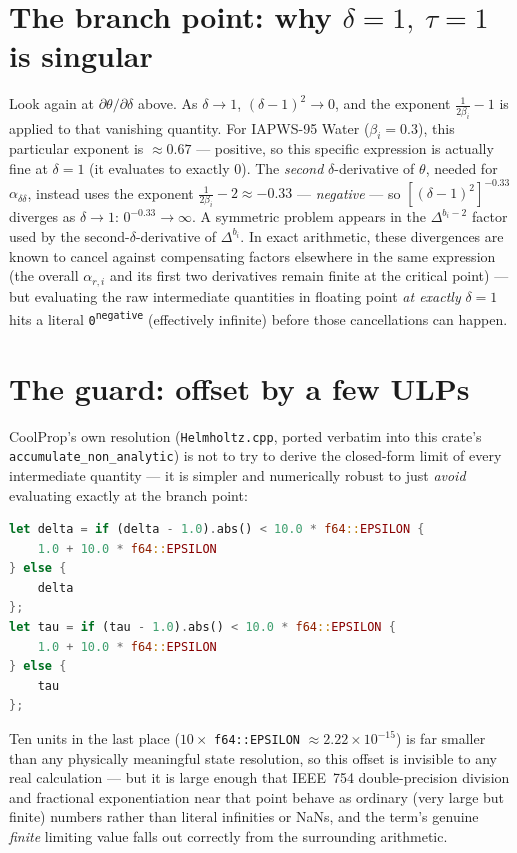 \documentclass[11pt]{article}
\begin{document}
\section{The branch point: why $\delta=1,\ \tau=1$ is singular}

Look again at $\partial\theta/\partial\delta$ above. As $\delta \to 1$,
$(\delta-1)^2 \to 0$, and the exponent $\frac{1}{2\beta_i}-1$ is applied to
that vanishing quantity. For IAPWS-95 Water ($\beta_i = 0.3$), this
particular exponent is $\approx 0.67$ — positive, so this specific
expression is actually fine at $\delta=1$ (it evaluates to exactly $0$). The
\emph{second} $\delta$-derivative of $\theta$, needed for
$\alpha_{\delta\delta}$, instead uses the exponent $\frac{1}{2\beta_i}-2
\approx -0.33$ — \emph{negative} — so $\left[(\delta-1)^2\right]^{-0.33}$
diverges as $\delta \to 1$: $0^{-0.33} \to \infty$. A symmetric problem
appears in the $\Delta^{b_i-2}$ factor used by the second-$\delta$-derivative
of $\Delta^{b_i}$. In exact arithmetic, these divergences are known to
cancel against compensating factors elsewhere in the same expression (the
overall $\alpha_{r,i}$ and its first two derivatives remain finite at the
critical point) — but evaluating the raw intermediate quantities in floating
point \emph{at exactly} $\delta=1$ hits a literal
\texttt{0\textsuperscript{negative}} (effectively infinite) before those
cancellations can happen.

\section{The guard: offset by a few ULPs}

CoolProp's own resolution (\texttt{Helmholtz.cpp}, ported verbatim into this
crate's \texttt{accumulate\_non\_analytic}) is not to try to derive the
closed-form limit of every intermediate quantity — it is simpler and
numerically robust to just \emph{avoid} evaluating exactly at the branch
point:
\begin{lstlisting}[language=Rust]
let delta = if (delta - 1.0).abs() < 10.0 * f64::EPSILON {
    1.0 + 10.0 * f64::EPSILON
} else {
    delta
};
let tau = if (tau - 1.0).abs() < 10.0 * f64::EPSILON {
    1.0 + 10.0 * f64::EPSILON
} else {
    tau
};
\end{lstlisting}
Ten units in the last place ($10 \times$ \texttt{f64::EPSILON} $\approx
2.22\times10^{-15}$) is far smaller than any physically meaningful state
resolution, so this offset is invisible to any real calculation — but it is
large enough that IEEE~754 double-precision division and fractional
exponentiation near that point behave as ordinary (very large but finite)
numbers rather than literal infinities or NaNs, and the term's genuine
\emph{finite} limiting value falls out correctly from the surrounding
arithmetic.
\end{document}
